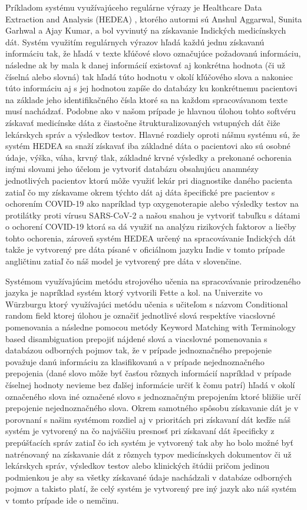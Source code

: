 Príkladom systému využívajúceho regulárne výrazy je Healthcare Data Extraction and Analysis (HEDEA) \cite{hedea}, ktorého
autormi sú Anshul Aggarwal, Sunita Garhwal a Ajay Kumar, 
a bol vyvinutý na získavanie Indických medicínskych dát.
Systém využitím regulárnych výrazov hľadá každú jednu
získavanú informáciu tak, že hľadá v texte kľúčové slovo
označujúce požadovanú informáciu, následne ak by mala 
k danej informácií existovať aj konkrétna hodnota
(či už číselná alebo slovná) tak hľadá túto hodnotu v okolí
kľúčového slova a nakoniec túto informáciu aj 
s jej hodnotou zapíše do databázy ku konkrétnemu 
pacientovi na základe jeho identifikačného
čísla ktoré sa na každom spracovávanom texte musí nachádzať. 
Podobne ako v našom prípade je hlavnou úlohou tohto 
softvéru získavať medicínske dáta z čiastočne štrukturalizovaných
vstupných dát čiže lekárskych správ a výsledkov testov.
Hlavné rozdiely oproti nášmu systému sú, že systém HEDEA
sa snaží získavať iba základné dáta o pacientovi ako sú osobné
údaje, výška, váha, krvný tlak, základné krvné výsledky a 
prekonané ochorenia inými slovami jeho účelom je vytvoriť
databázu obsahujúcu anamnézy jednotlivých pacientov
ktorú môže využiť lekár pri diagnostike daného pacienta
zatiaľ čo my získavame okrem týchto dát aj dáta 
špecifické pre pacientov s ochorením COVID-19 ako
napríklad typ oxygenoterapie alebo výsledky testov
na protilátky proti vírusu SARS-CoV-2 a našou snahou je 
vytvoriť tabuľku s dátami o ochorení COVID-19 ktorá
sa dá využiť na analýzu rizikových faktorov a liečby
tohto ochorenia, zároveň systém HEDEA určený na 
spracovávanie Indických dát
takže je vytvorený pre dáta písané v oficiálnom jazyku
Indie v tomto prípade angličtinu zatiaľ čo náš model
je vytvorený pre dáta v slovenčine.

Systémom využívajúcim metódu strojového učenia na
spracovávanie prirodzeného jazyka je napríklad 
systém ktorý vytvorili Fette a kol. na Univerzite
vo Würzburgu \cite{infExtGer} ktorý využívajúci metódu učenia s 
učiteľom s názvom Conditional random field ktorej úlohou
je označiť jednotlivé slová respektíve viacslovné
pomenovania \cite{CRF} a následne pomocou metódy 
Keyword Matching with Terminology based disambiguation
prepojiť nájdené slová a viacslovné pomenovania s databázou
odborných pojmov tak, že v prípade jednoznačného prepojenie 
považuje danú informáciu za klasifikovanú a v
prípade nejednoznačného prepojenia (dané slovo môže byť časťou
rôznych informácií napríklad v prípade číselnej hodnoty nevieme
bez ďalšej informácie určiť k čomu patrí) hľadá v okolí označeného 
slova iné označené slovo s jednoznačným prepojením ktoré bližšie 
určí prepojenie nejednoznačného slova. Okrem samotného spôsobu
získavanie dát je v porovnaní s našim systémom rozdiel 
aj v prioritách pri získavaní dát keďže náš systém 
je vytvorený na čo najväčšiu presnosť pri získavaní
dát špecificky z prepúšťacích správ zatiaľ čo ich 
systém je vytvorený tak aby ho bolo možné byť natrénovaný na 
získavanie dát z rôznych typov medicínskych dokumentov či už
lekárskych správ, výsledkov testov alebo klinických 
štúdii pričom jedinou podmienkou je aby sa všetky získavané údaje 
nachádzali v databáze odborných pojmov a takisto platí, 
že celý systém je vytvorený 
pre iný jazyk ako náš systém v tomto prípade ide o 
nemčinu. 

